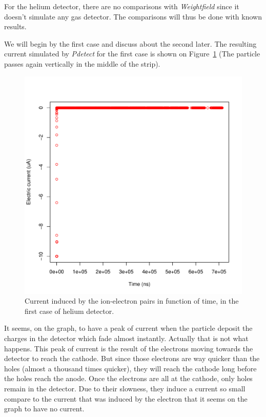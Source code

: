 \documentclass[11pt]{article}
\begin{document}
				For the helium detector, there are no comparisons with \textit{Weightfield} since it doesn't simulate
				any gas detector. The comparisons will thus be done with known results.

				We will begin by the first case and discuss about the second later.
				The resulting current simulated by \textit{Pdetect} for the first case is shown on
				Figure~\ref{fig:helium1_unprecise} (The particle passes again vertically in the middle of
				the strip).

				\begin{figure}[H]
				  \center
				  \includegraphics[scale=0.5]{images/applications/helium1_unprecise.pdf}
				  \caption{Current induced by the ion-electron pairs in function of time, in the first case of helium detector.}
				  \label{fig:helium1_unprecise}
				\end{figure}

				It seems, on the graph, to have a peak of current when the particle deposit the charges in the
				detector which fade almost instantly. Actually that is not what happens. This peak of current
				is the result of the electrons moving towards the detector to reach the cathode. But since those
				electrons are way quicker than the holes (almost a thousand times quicker), they will reach the
				cathode long before the holes reach the anode. Once the electrons are all at the cathode, only holes
				remain in the detector. Due to their slowness, they induce a current so small compare to the
				current that was induced by the electron that it seems on the graph to have no current.
\end{document}

